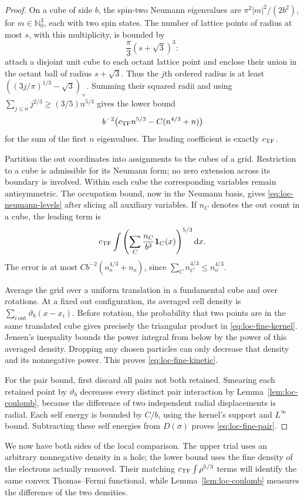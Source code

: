 \begin{proof}
On a cube of side $b$, the spin-two Neumann eigenvalues are
$\pi^2|m|^2/(2b^2)$, for $m\in\mathbb N_0^3$, each with two spin
states.  The number of lattice points of radius at most $s$, with
this multiplicity, is bounded by
\[
 \frac\pi3(s+\sqrt3)^3:
\]
attach a disjoint unit cube to each octant lattice point and enclose
their union in the octant ball of radius $s+\sqrt3$.  Thus the $j$th
ordered radius is at least
$((3j/\pi)^{1/3}-\sqrt3)_+$.  Summing their squared radii and using
$\sum_{j\leq n}j^{2/3}\geq(3/5)n^{5/3}$ gives the lower bound
\begin{equation}\label{eq:loc-neumann-levels}
 b^{-2}\big(c_{\mathrm{TF}} n^{5/3}-C(n^{4/3}+n)\big)
\end{equation}
for the sum of the first $n$ eigenvalues.  The leading coefficient
is exactly $c_{\mathrm{TF}}$.

Partition the out coordinates into assignments to the cubes of a
grid.  Restriction to a cube is admissible for its Neumann form;
no zero extension across its boundary is involved.  Within each
cube the corresponding variables remain antisymmetric.  The
occupation bound, now in the Neumann basis, gives
\eqref{eq:loc-neumann-levels} after slicing all auxiliary variables.
If $n_C$ denotes the out count in a cube, the leading term is
\[
 c_{\mathrm{TF}}\int\left(\sum_C\frac{n_C}{b^3}\mathbf1_C(x)\right)^{5/3}
                  \mathrm dx.
\]
The error is at most $Cb^{-2}(n_o^{4/3}+n_o)$, since
$\sum_Cn_C^{4/3}\leq n_o^{4/3}$.

Average the grid over a uniform translation in a fundamental cube
and over rotations.  At a fixed out configuration, its averaged
cell density is $\sum_{i\ \mathrm{out}}\vartheta_b(x-x_i)$.
Before rotation, the probability that two points are in the same
translated cube gives precisely the triangular product in
\eqref{eq:loc-fine-kernel}.  Jensen's inequality bounds the power
integral from below by the power of this averaged density.
Dropping any chosen particles can only decrease that density and
its nonnegative power.  This proves \eqref{eq:loc-fine-kinetic}.

For the pair bound, first discard all pairs not both retained.
Smearing each retained point by $\vartheta_b$ decreases every
distinct pair interaction by Lemma~\ref{lem:loc-coulomb}, because
the difference of two independent radial displacements is radial.
Each self energy is bounded by $C/b$, using the kernel's support and
$L^\infty$ bound.  Subtracting these self energies from $D(\sigma)$
proves \eqref{eq:loc-fine-pair}.
\end{proof}

We now have both sides of the local comparison.  The upper trial
uses an arbitrary nonnegative density in a hole; the lower bound
uses the fine density of the electrons actually removed.  Their
matching $c_{\mathrm{TF}}\int\rho^{5/3}$ terms will identify the same convex
Thomas--Fermi functional, while Lemma~\ref{lem:loc-coulomb} measures
the difference of the two densities.
